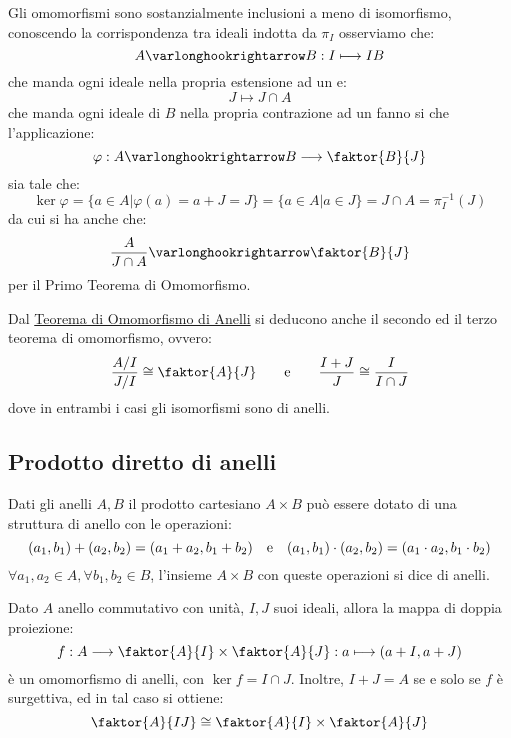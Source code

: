 \documentclass[11pt]{scrartcl}
\begin{document}
\begin{remark}
    Gli omomorfismi sono sostanzialmente inclusioni a meno di isomorfismo, conoscendo la corrispondenza tra ideali indotta da $\pi_I$ osserviamo che:
        \[ A \varlonghookrightarrow B : I \longmapsto IB
            \]
    che manda ogni ideale nella propria estensione ad un  e:
        \[ J \longmapsto J\cap A
            \]
    che manda ogni ideale di $B$ nella propria contrazione ad un  fanno si che l'applicazione:
        \[ \varphi : A \varlonghookrightarrow B \longrightarrow \faktor{B}{J}
            \]
    sia tale che:
        \[ \ker \varphi = \{a \in A | \varphi(a) = a + J = J\} = \{a \in A | a \in J\} = J \cap A = \pi_{I}^{-1}(J)
            \]
    da cui si ha anche che:
        \[ \frac{A}{J \cap A} \varlonghookrightarrow \faktor{B}{J}
            \]
    per il Primo Teorema di Omomorfismo.
\end{remark}

\begin{remark}
Dal \hyperref[omo]{Teorema di Omomorfismo di Anelli} si deducono anche il secondo ed il terzo teorema di omomorfismo, ovvero:
    \[ \frac{A/I}{J/I} \cong \faktor{A}{J} \qquad \text e \qquad \frac{I+J}{J} \cong \frac{I}{I \cap J}
        \]
dove in entrambi i casi gli isomorfismi sono di anelli.    
\end{remark}

\newpage
\subsection{Prodotto diretto di anelli}
\begin{definition}
    Dati gli anelli $A,B$ il prodotto cartesiano $A \times B$ può essere dotato di una struttura di anello con le operazioni:
        \[ (a_1,b_1) + (a_2,b_2) = (a_1+a_2,b_1+b_2) \quad \text e \quad (a_1,b_1) \cdot (a_2,b_2) = (a_1 \cdot a_2,b_1 \cdot b_2) 
            \]
    $\forall a_1,a_2 \in A, \forall b_1,b_2 \in B$, l'insieme $A \times B$ con queste operazioni si dice  di anelli.
\end{definition}

\begin{theorem}
    \label{t:cinese}
    Dato $A$ anello commutativo con unità, $I,J$ suoi ideali, allora la mappa di doppia proiezione:
    \[ f: A \longrightarrow \faktor{A}{I} \times \faktor{A}{J} : a \longmapsto (a+I,a+J)
        \]
    è un omomorfismo di anelli, con $\ker f = I \cap J$. Inoltre, $I+J = A$ se e solo se $f$ è surgettiva, ed in tal caso si ottiene:
    \[ \faktor{A}{IJ} \cong \faktor{A}{I} \times \faktor{A}{J}
        \]
\end{theorem}
\end{document}
